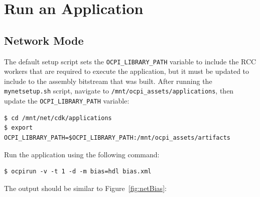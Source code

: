 \section{Run an Application}
\subsection{Network Mode}
The default setup script sets the \texttt{OCPI\_LIBRARY\_PATH} variable to include the RCC workers that are required to execute the application, but it must be updated to include to the assembly bitstream that was built.  After running the \texttt{mynetsetup.sh} script, navigate to  \texttt{/mnt/ocpi\_assets/applications}, then update the \texttt{OCPI\_LIBRARY\_PATH} variable:
\begin{verbatim}
$ cd /mnt/net/cdk/applications
$ export OCPI_LIBRARY_PATH=$OCPI_LIBRARY_PATH:/mnt/ocpi_assets/artifacts
\end{verbatim}
Run the application using the following command:
\begin{verbatim}
$ ocpirun -v -t 1 -d -m bias=hdl bias.xml
\end{verbatim}
The output should be similar to Figure~\ref{fig:netBias}:
